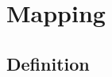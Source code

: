 \resetdatestamp

\newcommand\Dfrac[2]{\frac{\displaystyle #1}{\displaystyle #2}}
\newcommand{\mathBF}[1]{\mbox{\boldmath $#1$}}
\newcommand{\C}[1]{\mathBF{#1}}

\chapter{Mapping}

\section{Definition}

